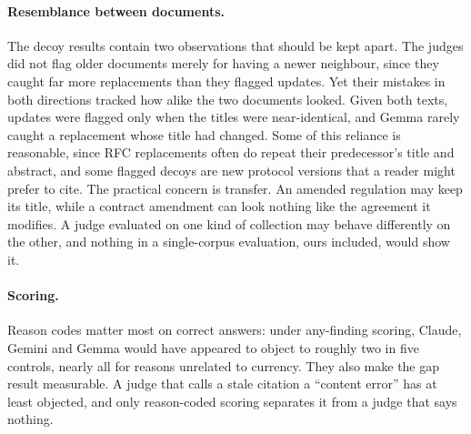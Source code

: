 \paragraph{Resemblance between documents.}
The decoy results contain two observations that should be kept apart. The judges did not flag older documents merely
for having a newer neighbour, since they caught far more replacements than they flagged updates. Yet their mistakes in
both directions tracked how alike the two documents looked. Given both texts, updates were flagged only when the titles were
near-identical, and Gemma rarely caught a replacement whose title had changed. Some of this reliance is reasonable,
since RFC replacements often do repeat their predecessor's title and abstract, and some flagged decoys are new
protocol versions that a reader might prefer to cite. The practical concern is transfer. An amended regulation may keep
its title, while a contract amendment can look nothing like the agreement it modifies. A judge evaluated on one kind
of collection may behave differently on the other, and nothing in a single-corpus evaluation, ours included, would show
it.

\paragraph{Scoring.}
Reason codes matter most on correct answers: under any-finding scoring, Claude, Gemini and Gemma would have appeared
to object to roughly two in five controls, nearly all for reasons unrelated to currency. They also make the gap result
measurable. A judge that calls a stale citation a ``content error'' has at least objected, and only reason-coded
scoring separates it from a judge that says nothing.
